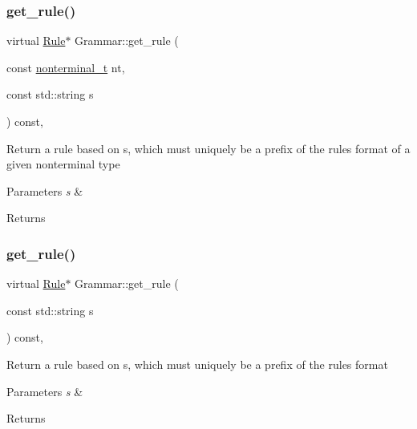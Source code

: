 \subsubsection{\texorpdfstring{get\+\_\+rule()}{get\_rule()}\hspace{0.1cm}{\footnotesize\ttfamily [4/5]}}
{\footnotesize\ttfamily virtual \hyperlink{class_rule}{Rule}$\ast$ Grammar\+::get\+\_\+rule (\begin{DoxyParamCaption}\item[{const \hyperlink{_nonterminal_8h_a5c1f658dc7560600a16d22408bd716ca}{nonterminal\+\_\+t}}]{nt,  }\item[{const std\+::string}]{s }\end{DoxyParamCaption}) const\hspace{0.3cm}{\ttfamily [inline]}, {\ttfamily [virtual]}}

Return a rule based on s, which must uniquely be a prefix of the rule\textquotesingle{}s format of a given nonterminal type 
\begin{DoxyParams}{Parameters}
{\em s} & \\
\hline
\end{DoxyParams}
\begin{DoxyReturn}{Returns}

\end{DoxyReturn}
\mbox{\label{class_grammar_adecdec03b3211bd3b6800511c7ed5dd9}} 
\subsubsection{\texorpdfstring{get\+\_\+rule()}{get\_rule()}\hspace{0.1cm}{\footnotesize\ttfamily [5/5]}}
{\footnotesize\ttfamily virtual \hyperlink{class_rule}{Rule}$\ast$ Grammar\+::get\+\_\+rule (\begin{DoxyParamCaption}\item[{const std\+::string}]{s }\end{DoxyParamCaption}) const\hspace{0.3cm}{\ttfamily [inline]}, {\ttfamily [virtual]}}

Return a rule based on s, which must uniquely be a prefix of the rule\textquotesingle{}s format 
\begin{DoxyParams}{Parameters}
{\em s} & \\
\hline
\end{DoxyParams}
\begin{DoxyReturn}{Returns}

\end{DoxyReturn}
\mbox{\label{class_grammar_a607aa205d57a1b61b07f9ef57adcf697}} 
